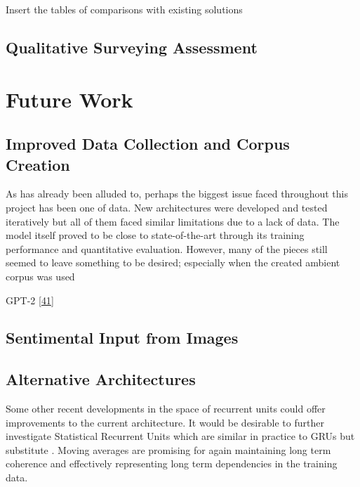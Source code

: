 \documentclass[12pt,]{article}
\begin{document}
Insert the tables of comparisons with existing solutions

\hypertarget{qualitative-surveying-assessment}{%
\subsection{Qualitative Surveying
Assessment}\label{qualitative-surveying-assessment}}

\hypertarget{future-work}{%
\section{Future Work}\label{future-work}}

\hypertarget{improved-data-collection-and-corpus-creation}{%
\subsection{Improved Data Collection and Corpus
Creation}\label{improved-data-collection-and-corpus-creation}}

As has already been alluded to, perhaps the biggest issue faced
throughout this project has been one of data. New architectures were
developed and tested iteratively but all of them faced similar
limitations due to a lack of data. The model itself proved to be close
to state-of-the-art through its training performance and quantitative
evaluation. However, many of the pieces still seemed to leave something
to be desired; especially when the created ambient corpus was used

GPT-2 {[}\protect\hyperlink{ref-radford2018language}{41}{]}

\hypertarget{sentimental-input-from-images}{%
\subsection{Sentimental Input from
Images}\label{sentimental-input-from-images}}

\hypertarget{alternative-architectures}{%
\subsection{Alternative Architectures}\label{alternative-architectures}}

Some other recent developments in the space of recurrent units could
offer improvements to the current architecture. It would be desirable to
further investigate Statistical Recurrent Units which are similar in
practice to GRUs but substitute . Moving averages are promising for
again maintaining long term coherence and effectively representing long
term dependencies in the training data.
\end{document}
